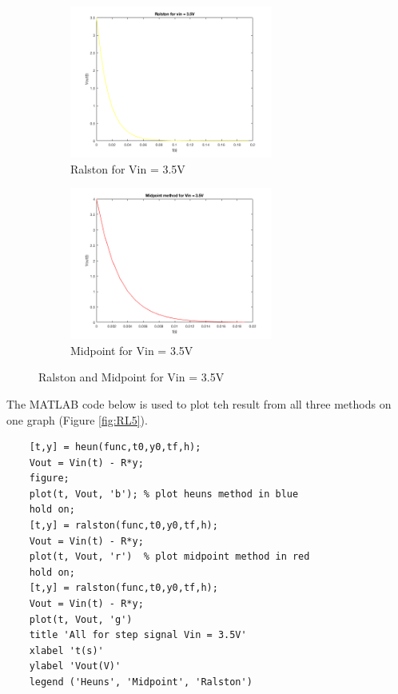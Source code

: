 \documentclass[11pt,a4paper]{article}
\begin{document}
\begin{figure}[b]
	\begin{subfigure}{.5\textwidth}
  		\includegraphics[width=.9\linewidth,height = 5cm]{Ex1_Figs/ralston_step.png}
  		\caption[right]{Ralston for Vin = 3.5V}
  		\label{fig:RL4}
	\end{subfigure}
	\begin{subfigure}{.5\textwidth}
  		\includegraphics[width=.9\linewidth,height = 5cm]{Ex1_Figs/midpoint_step.png}
  		\caption{Midpoint for Vin = 3.5V}
  		\label{fig:RL3}
	\end{subfigure}
	\caption{Ralston and Midpoint for Vin = 3.5V}
	\label{fig:test}
\end{figure}

\pagebreak

The MATLAB code below is used to plot teh result from all three methods on one graph (Figure \ref{fig:RL5}).

\begin{verbatim}
    [t,y] = heun(func,t0,y0,tf,h);
    Vout = Vin(t) - R*y;
    figure;
    plot(t, Vout, 'b'); % plot heuns method in blue
    hold on;
    [t,y] = ralston(func,t0,y0,tf,h);
    Vout = Vin(t) - R*y;
    plot(t, Vout, 'r')  % plot midpoint method in red
    hold on;
    [t,y] = ralston(func,t0,y0,tf,h);
    Vout = Vin(t) - R*y;
    plot(t, Vout, 'g')
    title 'All for step signal Vin = 3.5V'
    xlabel 't(s)'
    ylabel 'Vout(V)'
    legend ('Heuns', 'Midpoint', 'Ralston')
    \end{verbatim}
\end{document}
